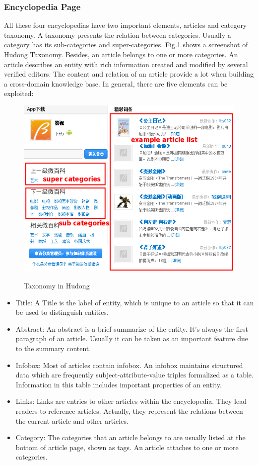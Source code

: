\documentclass[runningheads,a4paper]{llncs}
\begin{document}
\subsubsection{Encyclopedia Page}
\label{sec:ep}
All these four encyclopedias have two important elements, articles and category taxonomy. A taxonomy presents the relation between categories. Usually a category has its sub-categories and super-categories. Fig.\ref{fig:hudong-taxonomy} shows a screenshot of Hudong Taxonomy. Besides, an article belongs to one or more categories. An article describes an entity with rich information created and modified by several verified editors. The content and relation of an article provide a lot when building a cross-domain knowledge base. In general, there are five elements can be exploited:
\begin{figure}
    \centering
    \begin{minipage}[t]{0.8\textwidth}
        \centerline{\includegraphics[width=0.8\columnwidth]{fig/hudong-taxonomy2}}
        \label{fig:hudong-taxonomy}
        \caption{Taxonomy in Hudong}
    \end{minipage}%
\end{figure}
\begin{itemize}
  \item Title: A Title is the label of entity, which is unique to an article so that it can be used to distinguish entities.
  \item Abstract: An abstract is a brief summarize of the entity. It's always the first paragraph of an article. Usually it can be taken as an important feature due to the summary content.
  \item Infobox: Most of articles contain infobox. An infobox maintains structured data which are frequently subject-attribute-value triples formalized as a table. Information in this table includes important properties of an entity.
  \item Links: Links are entries to other articles within the encyclopedia. They lead readers to reference articles. Actually, they represent the relations between the current article and other articles.
  \item Category: The categories that an article belongs to are usually listed at the bottom of article page, shown as tags. An article attaches to one or more categories.
\end{itemize}
\end{document}
